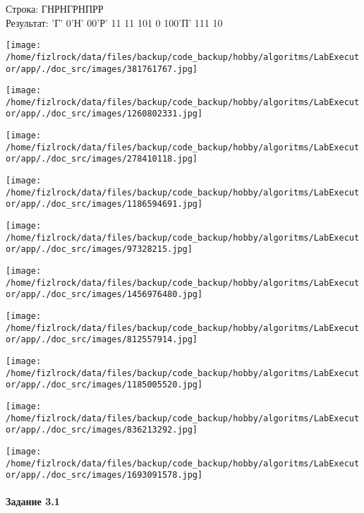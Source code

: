 \documentclass[a4paper, 12pt]{article}
\begin{document}
Строка: 
ГНРНГРНПРР\\
Результат: 'Г' 0'Н' 00'Р' 11 11 101 0 100'П' 111 10

\texttt{[image: /home/fizlrock/data/files/backup/code\_backup/hobby/algoritms/LabExecutor/app/./doc\_src/images/381761767.jpg]}

\texttt{[image: /home/fizlrock/data/files/backup/code\_backup/hobby/algoritms/LabExecutor/app/./doc\_src/images/1260802331.jpg]}

\texttt{[image: /home/fizlrock/data/files/backup/code\_backup/hobby/algoritms/LabExecutor/app/./doc\_src/images/278410118.jpg]}

\texttt{[image: /home/fizlrock/data/files/backup/code\_backup/hobby/algoritms/LabExecutor/app/./doc\_src/images/1186594691.jpg]}

\texttt{[image: /home/fizlrock/data/files/backup/code\_backup/hobby/algoritms/LabExecutor/app/./doc\_src/images/97328215.jpg]}

\texttt{[image: /home/fizlrock/data/files/backup/code\_backup/hobby/algoritms/LabExecutor/app/./doc\_src/images/1456976480.jpg]}

\texttt{[image: /home/fizlrock/data/files/backup/code\_backup/hobby/algoritms/LabExecutor/app/./doc\_src/images/812557914.jpg]}

\texttt{[image: /home/fizlrock/data/files/backup/code\_backup/hobby/algoritms/LabExecutor/app/./doc\_src/images/1185005520.jpg]}

\texttt{[image: /home/fizlrock/data/files/backup/code\_backup/hobby/algoritms/LabExecutor/app/./doc\_src/images/836213292.jpg]}

\texttt{[image: /home/fizlrock/data/files/backup/code\_backup/hobby/algoritms/LabExecutor/app/./doc\_src/images/1693091578.jpg]}
\pagebreak
\paragraph{Задание 3.1}
\end{document}
